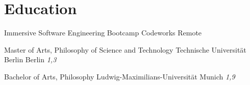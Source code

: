 \section{Education}
\cventry{}
  {Immersive Software Engineering Bootcamp}
  {Codeworks}
  {Remote}
  {}
  {}  %

\cventry{}
  {Master of Arts, Philosophy of Science and Technology}
  {Technische Universität Berlin}
  {Berlin}
  {\textit{1,3}}
  {}


\cventry{}
  {Bachelor of Arts, Philosophy}
  {Ludwig-Maximilians-Universität}
  {Munich}
  {\textit{1,9}}
  {}
%  
